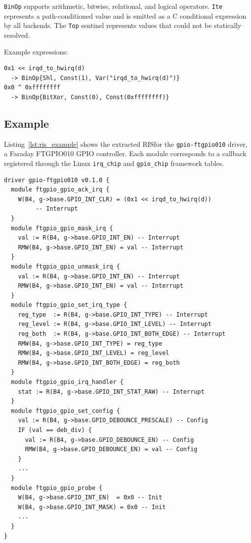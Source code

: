 \documentclass[sigplan, screen, review, anonymous]{acmart}
\newcommand{\rislang}{RIS}
\begin{document}
\texttt{BinOp} supports arithmetic, bitwise, relational, and logical operators. \texttt{Ite} represents a path-conditioned value and is emitted as a C conditional expression by all backends. The \texttt{Top} sentinel represents values that could not be statically resolved.

Example expressions:
\begin{lstlisting}[breaklines=true]
0x1 << irqd_to_hwirq(d)
  -> BinOp{Shl, Const(1), Var("irqd_to_hwirq(d)")}
0x0 ^ 0xffffffff
  -> BinOp{BitXor, Const(0), Const(0xffffffff)}
\end{lstlisting}

\subsection{Example}

Listing~\ref{lst:ris_example} shows the extracted \rislang for the \texttt{gpio-ftgpio010} driver, a Faraday FTGPIO010 GPIO controller. Each module corresponds to a callback registered through the Linux \texttt{irq\_chip} and \texttt{gpio\_chip} framework tables.

\begin{lstlisting}[language=ris,label={lst:ris_example},caption={Excerpt from the extracted \rislang specification for gpio-ftgpio010 (14 modules, 32 ops including generic-library summaries)}]
driver gpio-ftgpio010 v0.1.0 {
  module ftgpio_gpio_ack_irq {
    W(B4, g->base.GPIO_INT_CLR) = (0x1 << irqd_to_hwirq(d))
         -- Interrupt
  }
  module ftgpio_gpio_mask_irq {
    val := R(B4, g->base.GPIO_INT_EN) -- Interrupt
    RMW(B4, g->base.GPIO_INT_EN) = val -- Interrupt
  }
  module ftgpio_gpio_unmask_irq {
    val := R(B4, g->base.GPIO_INT_EN) -- Interrupt
    RMW(B4, g->base.GPIO_INT_EN) = val -- Interrupt
  }
  module ftgpio_gpio_set_irq_type {
    reg_type  := R(B4, g->base.GPIO_INT_TYPE) -- Interrupt
    reg_level := R(B4, g->base.GPIO_INT_LEVEL) -- Interrupt
    reg_both  := R(B4, g->base.GPIO_INT_BOTH_EDGE) -- Interrupt
    RMW(B4, g->base.GPIO_INT_TYPE) = reg_type
    RMW(B4, g->base.GPIO_INT_LEVEL) = reg_level
    RMW(B4, g->base.GPIO_INT_BOTH_EDGE) = reg_both
  }
  module ftgpio_gpio_irq_handler {
    stat := R(B4, g->base.GPIO_INT_STAT_RAW) -- Interrupt
  }
  module ftgpio_gpio_set_config {
    val := R(B4, g->base.GPIO_DEBOUNCE_PRESCALE) -- Config
    IF (val == deb_div) {
      val := R(B4, g->base.GPIO_DEBOUNCE_EN) -- Config
      RMW(B4, g->base.GPIO_DEBOUNCE_EN) = val -- Config
    }
    ...
  }
  module ftgpio_gpio_probe {
    W(B4, g->base.GPIO_INT_EN)  = 0x0 -- Init
    W(B4, g->base.GPIO_INT_MASK) = 0x0 -- Init
    ...
  }
}
\end{lstlisting}
\end{document}
